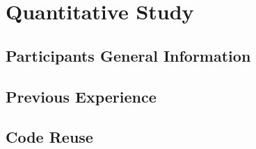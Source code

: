 \chapter{Quantitative Study}

\section{Participants General Information}

\section{Previous Experience}

\section{Code Reuse}


